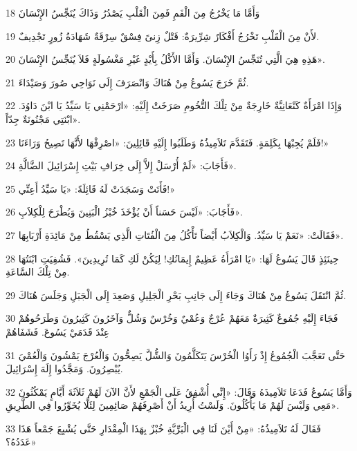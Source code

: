 \par 18 وَأَمَّا مَا يَخْرُجُ مِنَ الْفَمِ فَمِنَ الْقَلْبِ يَصْدُرُ وَذَاكَ يُنَجِّسُ الإِنْسَانَ
\par 19 لأَنْ مِنَ الْقَلْبِ تَخْرُجُ أَفْكَارٌ شِرِّيرَةٌ: قَتْلٌ زِنىً فِسْقٌ سِرْقَةٌ شَهَادَةُ زُورٍ تَجْدِيفٌ.
\par 20 هَذِهِ هِيَ الَّتِي تُنَجِّسُ الإِنْسَانَ. وَأَمَّا الأَكْلُ بِأَيْدٍ غَيْرِ مَغْسُولَةٍ فَلاَ يُنَجِّسُ الإِنْسَانَ».
\par 21 ثُمَّ خَرَجَ يَسُوعُ مِنْ هُنَاكَ وَانْصَرَفَ إِلَى نَوَاحِي صُورَ وَصَيْدَاءَ.
\par 22 وَإِذَا امْرَأَةٌ كَنْعَانِيَّةٌ خَارِجَةٌ مِنْ تِلْكَ التُّخُومِ صَرَخَتْ إِلَيْهِ: «ارْحَمْنِي يَا سَيِّدُ يَا ابْنَ دَاوُدَ. ابْنَتِي مَجْنُونَةٌ جِدّاً».
\par 23 فَلَمْ يُجِبْهَا بِكَلِمَةٍ. فَتَقَدَّمَ تَلاَمِيذُهُ وَطَلَبُوا إِلَيْهِ قَائِلِينَ: «اصْرِفْهَا لأَنَّهَا تَصِيحُ وَرَاءَنَا!»
\par 24 فَأَجَابَ: «لَمْ أُرْسَلْ إِلاَّ إِلَى خِرَافِ بَيْتِ إِسْرَائِيلَ الضَّالَّةِ».
\par 25 فَأَتَتْ وَسَجَدَتْ لَهُ قَائِلَةً: «يَا سَيِّدُ أَعِنِّي!»
\par 26 فَأَجَابَ: «لَيْسَ حَسَناً أَنْ يُؤْخَذَ خُبْزُ الْبَنِينَ وَيُطْرَحَ لِلْكِلاَبِ».
\par 27 فَقَالَتْ: «نَعَمْ يَا سَيِّدُ. وَالْكِلاَبُ أَيْضاً تَأْكُلُ مِنَ الْفُتَاتِ الَّذِي يَسْقُطُ مِنْ مَائِدَةِ أَرْبَابِهَا».
\par 28 حِينَئِذٍ قَالَ يَسُوعُ لَهَا: «يَا امْرَأَةُ عَظِيمٌ إِيمَانُكِ! لِيَكُنْ لَكِ كَمَا تُرِيدِينَ». فَشُفِيَتِ ابْنَتُهَا مِنْ تِلْكَ السَّاعَةِ.
\par 29 ثُمَّ انْتَقَلَ يَسُوعُ مِنْ هُنَاكَ وَجَاءَ إِلَى جَانِبِ بَحْرِ الْجَلِيلِ وَصَعِدَ إِلَى الْجَبَلِ وَجَلَسَ هُنَاكَ.
\par 30 فَجَاءَ إِلَيْهِ جُمُوعٌ كَثِيرَةٌ مَعَهُمْ عُرْجٌ وَعُمْيٌ وَخُرْسٌ وَشُلٌّ وَآخَرُونَ كَثِيرُونَ وَطَرَحُوهُمْ عِنْدَ قَدَمَيْ يَسُوعَ. فَشَفَاهُمْ
\par 31 حَتَّى تَعَجَّبَ الْجُمُوعُ إِذْ رَأَوُا الْخُرْسَ يَتَكَلَّمُونَ وَالشُّلَّ يَصِحُّونَ وَالْعُرْجَ يَمْشُونَ وَالْعُمْيَ يُبْصِرُونَ. وَمَجَّدُوا إِلَهَ إِسْرَائِيلَ.
\par 32 وَأَمَّا يَسُوعُ فَدَعَا تَلاَمِيذَهُ وَقَالَ: «إِنِّي أُشْفِقُ عَلَى الْجَمْعِ لأَنَّ الآنَ لَهُمْ ثَلاَثَةَ أَيَّامٍ يَمْكُثُونَ مَعِي وَلَيْسَ لَهُمْ مَا يَأْكُلُونَ. وَلَسْتُ أُرِيدُ أَنْ أَصْرِفَهُمْ صَائِمِينَ لِئَلَّا يُخَوِّرُوا فِي الطَّرِيقِ».
\par 33 فَقَالَ لَهُ تَلاَمِيذُهُ: «مِنْ أَيْنَ لَنَا فِي الْبَرِّيَّةِ خُبْزٌ بِهَذَا الْمِقْدَارِ حَتَّى يُشْبِعَ جَمْعاً هَذَا عَدَدُهُ؟»
